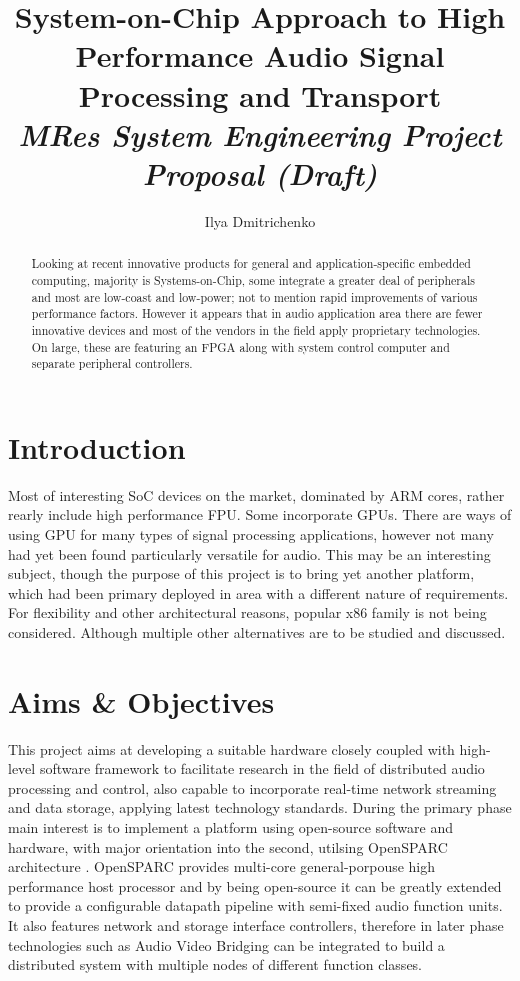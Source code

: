 \documentclass[twocolumn]{article}
\title{ System-on-Chip Approach to High Performance
	Audio Signal Processing and Transport \\
	\emph{\small{MRes System Engineering Project Proposal (Draft)}} }
\author{ Ilya Dmitrichenko }
\begin{document}
\maketitle

\begin{abstract}
\em

 Looking at recent innovative products for general and
 application-specific embedded computing, majority is
 Systems-on-Chip, some integrate a greater deal of peripherals
 and most are low-coast and low-power; not to mention rapid
 improvements of various performance factors.
  However it appears that in audio application area there
 are fewer innovative devices and most of the vendors in the
 field apply proprietary technologies. On large, these are
 featuring an FPGA along with system control computer and
 separate peripheral controllers.

\end{abstract}

\section{Introduction}

  Most of interesting SoC devices on the market, dominated by
 ARM cores, rather rearly include high performance FPU. Some
 incorporate GPUs. There are ways of using GPU for many types
 of signal processing applications, however not many had yet
 been found particularly versatile for audio. This may be an
 interesting subject, though the purpose of this project is
 to bring yet another platform, which had been primary deployed
 in area with a different nature of requirements.
  For flexibility and other architectural reasons, popular
 x86 family is not being considered. Although multiple other
 alternatives are to be studied and discussed.



\section{Aims \& Objectives}

  This project aims at developing a suitable hardware closely coupled
  with high-level software framework to facilitate research in the field
  of distributed audio processing and control, also capable to incorporate 
  real-time network streaming and data storage, applying latest technology
  standards.
  During the primary phase main interest is to implement a platform
  using open-source software and hardware, with major orientation into
  the second, utilsing OpenSPARC architecture \cite{weaver2008opensparc,
  page:opensparc:docs,page:opensparc:S1}.
  OpenSPARC provides multi-core general-porpouse high performance host
  processor and by being open-source it can be greatly extended to provide 
  a configurable datapath pipeline with semi-fixed audio function units.
  It also features network and storage interface controllers, therefore in
  later phase technologies such as Audio Video Bridging \cite{page:avb,
  wiki:avb} can be integrated to build a distributed system with multiple
  nodes of different function classes. 
  
\end{document}
